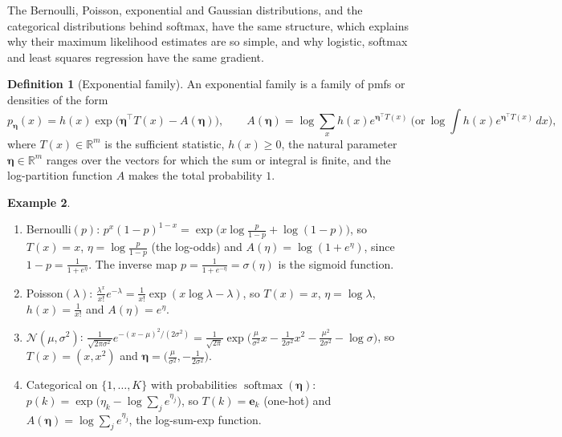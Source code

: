 \documentclass[11pt]{article}
\theoremstyle{definition}
\newtheorem{definition}{Definition}[section]
\newtheorem{example}[definition]{Example}
\theoremstyle{plain}
\theoremstyle{remark}
\DeclareMathOperator{\softmax}{softmax}
\begin{document}
The Bernoulli, Poisson, exponential and Gaussian distributions, and the categorical distributions behind softmax, have the same structure, which explains why their maximum likelihood estimates are so simple, and why logistic, softmax and least squares regression have the same gradient.

\begin{definition}[Exponential family]\label{def:exp-family}
    An exponential family is a family of pmfs or densities of the form
    \[p_{\boldsymbol{\eta}}(x) = h(x)\exp\big(\boldsymbol{\eta}^\top T(x) - A(\boldsymbol{\eta})\big), \qquad A(\boldsymbol{\eta}) = \log\sum_x h(x)e^{\boldsymbol{\eta}^\top T(x)} \ \Big(\text{or} \ \log\int h(x)e^{\boldsymbol{\eta}^\top T(x)}\, dx\Big),\]
    where $T(x) \in \mathbb{R}^m$ is the sufficient statistic, $h(x) \geq 0$, the natural parameter $\boldsymbol{\eta} \in \mathbb{R}^m$ ranges over the vectors for which the sum or integral is finite, and the log-partition function $A$ makes the total probability $1$.
\end{definition}

\begin{example}\label{ex:exp-families}
    \begin{enumerate}
        \item Bernoulli$(p)$: $p^x(1 - p)^{1 - x} = \exp\big(x\log\frac{p}{1 - p} + \log(1 - p)\big)$, so $T(x) = x$, $\eta = \log\frac{p}{1 - p}$ (the log-odds) and $A(\eta) = \log(1 + e^\eta)$, since $1 - p = \frac{1}{1 + e^\eta}$. The inverse map $p = \frac{1}{1 + e^{-\eta}} = \sigma(\eta)$ is the sigmoid function.
        \item Poisson$(\lambda)$: $\frac{\lambda^x}{x!}e^{-\lambda} = \frac{1}{x!}\exp(x\log\lambda - \lambda)$, so $T(x) = x$, $\eta = \log\lambda$, $h(x) = \frac{1}{x!}$ and $A(\eta) = e^\eta$.
        \item $\mathcal{N}(\mu, \sigma^2)$: $\frac{1}{\sqrt{2\pi\sigma^2}}e^{-(x - \mu)^2/(2\sigma^2)} = \frac{1}{\sqrt{2\pi}}\exp\big(\frac{\mu}{\sigma^2}x - \frac{1}{2\sigma^2}x^2 - \frac{\mu^2}{2\sigma^2} - \log\sigma\big)$, so $T(x) = (x, x^2)$ and $\boldsymbol{\eta} = \big(\frac{\mu}{\sigma^2}, -\frac{1}{2\sigma^2}\big)$.
        \item Categorical on $\{1, \ldots, K\}$ with probabilities $\softmax(\boldsymbol{\eta})$: $p(k) = \exp\big(\eta_k - \log\sum_j e^{\eta_j}\big)$, so $T(k) = \mathbf{e}_k$ (one-hot) and $A(\boldsymbol{\eta}) = \log\sum_j e^{\eta_j}$, the log-sum-exp function.
    \end{enumerate}
\end{example}
\end{document}
